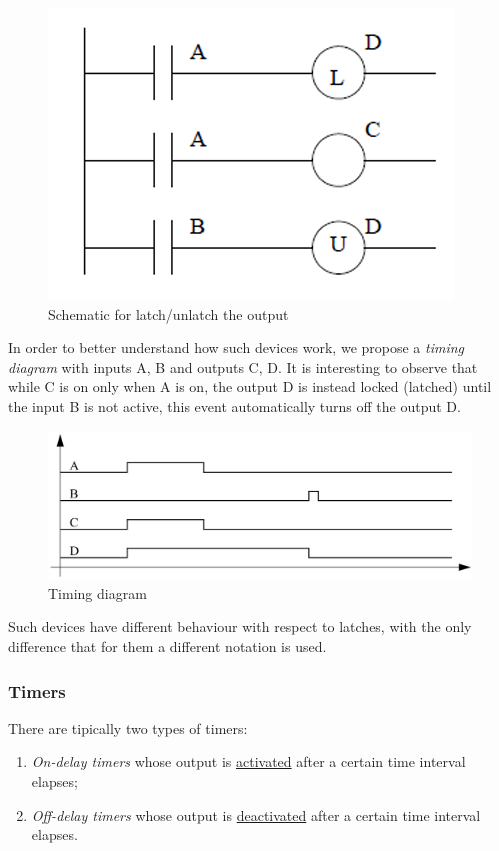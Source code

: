 \begin{figure}[h]
    \centering
    \includegraphics[scale=0.7]{img/latches.png}
    \caption{Schematic for latch/unlatch the output}
\end{figure}
In order to better understand how such devices work, we propose a \textit{timing diagram} with inputs A, B and outputs C, D. It is interesting to observe that while C is on only when A is on, the output D is instead locked (latched) until the input B is not active, this event automatically turns off the output D.

\begin{figure}[h]
    \centering
    \includegraphics[scale=0.25]{img/timing_latched.jpeg}
    \caption{Timing diagram}
\end{figure}

Such devices have different behaviour with respect to latches, with the only difference that for them a different notation is used.

\subsubsection{Timers}
There are tipically two types of timers: 
\begin{enumerate}
    \itemsep-0.3em
    \item \textit{On-delay timers} whose output is \underline{activated} after a certain time interval elapses; 
    \item \textit{Off-delay timers} whose output is \underline{deactivated} after a certain time interval elapses.
\end{enumerate}

